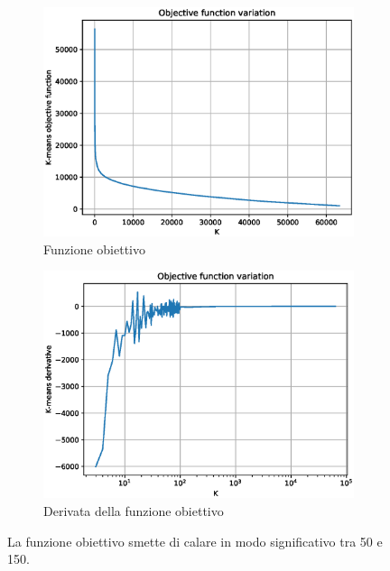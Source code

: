 \documentclass[
	12pt, %
	a4paper, %
	oneside, %
	headinclude,footinclude, %
	BCOR5mm, %
]{scrartcl}
\begin{document}
		\begin{figure}[!htb]
			\hspace{-2cm}
			\begin{subfigure}{.5\textwidth}
				\centering
				\includegraphics[scale=.5]{../results/KMeans.eps}
				\caption{Funzione obiettivo}
			\end{subfigure}
			\hspace{1.5cm}
			\begin{subfigure}{.5\textwidth}
				\centering
				\includegraphics[scale=.5]{../results/KMeansDerivative.eps}
				\caption{Derivata della funzione obiettivo}
			\end{subfigure}
			\caption{La funzione obiettivo smette di calare in modo significativo tra 50 e 150.}
			\label{fig:KMeansObj}
		\end{figure}
\end{document}
